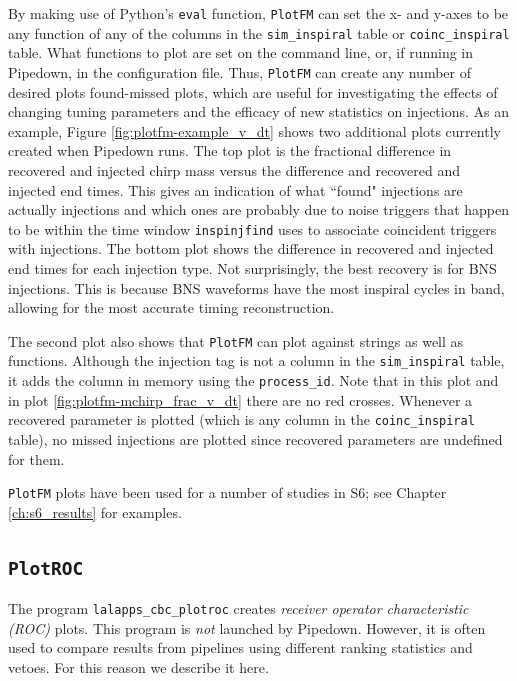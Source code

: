 By making use of Python's \verb|eval| function, \texttt{PlotFM} can set the x-
and y-axes to be any function of any of the columns in the \verb|sim_inspiral|
table or \verb|coinc_inspiral| table. What functions to plot are set on the
command line, or, if running in Pipedown, in the configuration file. Thus,
\texttt{PlotFM} can create any number of desired plots found-missed plots,
which are useful for investigating the effects of changing tuning parameters
and the efficacy of new statistics on injections. As an example, Figure
\ref{fig:plotfm-example_v_dt} shows two additional plots currently created when
Pipedown runs. The top plot is the fractional difference in recovered and
injected chirp mass versus the difference and recovered and injected end times.
This gives an indication of what ``found" injections are actually injections
and which ones are probably due to noise triggers that happen to be within the
time window \verb|inspinjfind| uses to associate coincident triggers with
injections. The bottom plot shows the difference in recovered and injected end
times for each injection type. Not surprisingly, the best recovery is for
\ac{BNS} injections. This is because \ac{BNS} waveforms have the most inspiral
cycles in band, allowing for the most accurate timing reconstruction.

The second plot also shows that \texttt{PlotFM} can plot against strings as
well as functions. Although the injection tag is not a column in the
\verb|sim_inspiral| table, it adds the column in memory using the
\verb|process_id|. Note that in this plot and in plot
\ref{fig:plotfm-mchirp_frac_v_dt} there are no red crosses. Whenever a
recovered parameter is plotted (which is any column in the
\verb|coinc_inspiral| table), no missed injections are plotted since recovered
parameters are undefined for them.

\texttt{PlotFM} plots have been used for a number of studies in \ac{S6}; see
Chapter \ref{ch:s6_results} for examples.

\subsection{\texttt{PlotROC}}
\label{sec:plotroc}

The program \verb|lalapps_cbc_plotroc| creates \emph{receiver operator
characteristic (ROC)} plots. This program is \emph{not} launched by Pipedown.
However, it is often used to compare results from pipelines using different
ranking statistics and vetoes. For this reason we describe it here.

